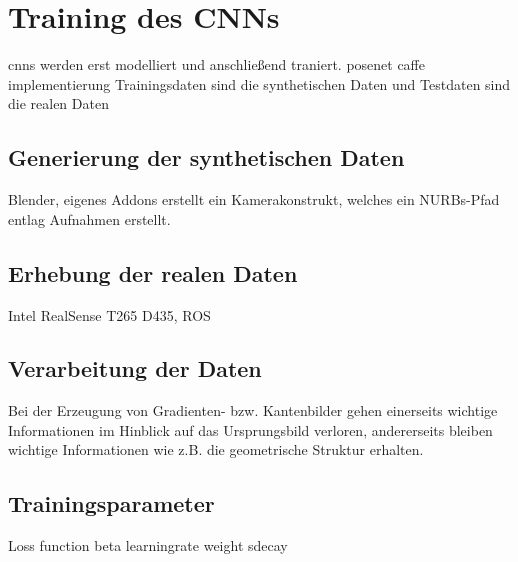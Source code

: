 
\section{Training des CNNs}
cnns werden erst modelliert und anschließend traniert.
posenet caffe implementierung
Trainingsdaten sind die synthetischen Daten und Testdaten sind die realen Daten


\subsection{Generierung der synthetischen Daten}
Blender,
eigenes Addons erstellt ein Kamerakonstrukt, welches ein NURBs-Pfad entlag Aufnahmen erstellt.

\subsection{Erhebung der realen Daten}
Intel RealSense T265 D435, ROS

\subsection{Verarbeitung der Daten}
Bei der Erzeugung von Gradienten- bzw. Kantenbilder gehen einerseits wichtige Informationen im Hinblick auf das Ursprungsbild verloren, andererseits bleiben wichtige Informationen wie z.B. die geometrische Struktur erhalten.
\subsection{Trainingsparameter}

Loss function beta
learningrate
weight sdecay